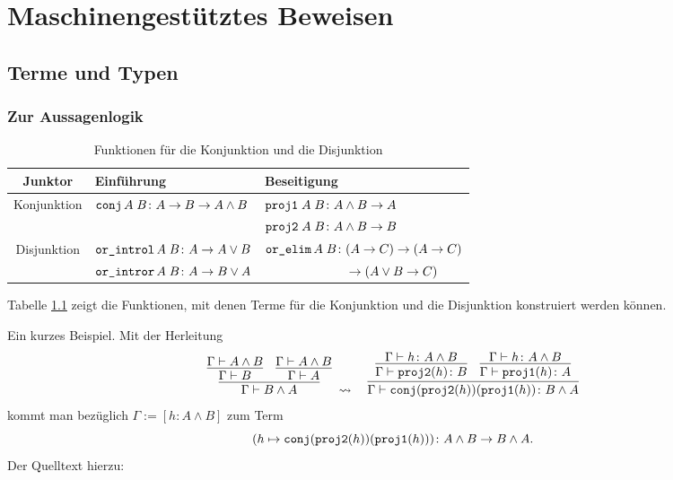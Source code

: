 
\chapter{Maschinengestütztes Beweisen}

\section{Terme und Typen}

\subsection{Zur Aussagenlogik}

\begin{table}
\begin{center}
\caption{Funktionen für die Konjunktion und die Disjunktion}
\label{tab:Funktionen-Konjunktion-Disjunktion}
\begin{tabular}{@{}cll@{}}
\toprule
\textbf{Junktor} & \textbf{Einführung} & \textbf{Beseitigung}\\
\midrule[\heavyrulewidth]
Konjunktion & $\texttt{conj}\,A\;B\colon A \to B \to A\land B$
& $\texttt{proj1}\;A\;B\colon A\land B\to A$\\
& & $\texttt{proj2}\;A\;B\colon A\land B\to B$\\
\midrule[\heavyrulewidth]
Disjunktion & $\texttt{or\_introl}\,A\;B\colon A\to A\lor B$
& $\texttt{or\_elim}\,A\;B\colon (A\to C)\to (A\to C)$\\
& $\texttt{or\_intror}\,A\;B\colon A\to B\lor A$
& $\phantom{\code{or\_elim}\,A\;B\colon}\to (A\lor B\to C)$\\
\bottomrule
\end{tabular}
\end{center}
\end{table}

Tabelle \ref{tab:Funktionen-Konjunktion-Disjunktion} zeigt die Funktionen,
mit denen Terme für die Konjunktion und die Disjunktion konstruiert
werden können.

Ein kurzes Beispiel. Mit der Herleitung
\[\infer{\Gamma\vdash B\land A}{
  \infer{\Gamma\vdash B}{\Gamma\vdash A\land B}
& \infer{\Gamma\vdash A}{\Gamma\vdash A\land B}}
\;\rightsquigarrow\quad
\infer{\Gamma\vdash\code{conj} (\code{proj2}(h)) (\code{proj1}(h))\colon B\land A}{
  \infer{\Gamma\vdash\code{proj2}(h)\colon B}{\Gamma\vdash h\colon A\land B}
& \infer{\Gamma\vdash\code{proj1}(h)\colon A}{\Gamma\vdash h\colon A\land B}}\]
kommt man bezüglich $\Gamma:=[h\colon A\land B]$ zum Term
\[(h\mapsto\texttt{conj} (\texttt{proj2}(h)) (\texttt{proj1}(h)))\colon A\land B\to B\land A.\]
Der Quelltext hierzu:

